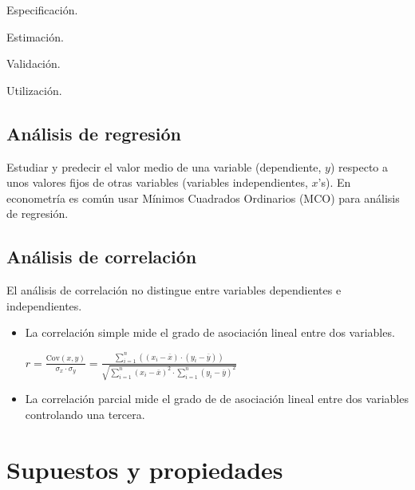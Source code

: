 \documentclass[10pt, a4paper, landscape]{article}
\newcommand{\Cov}{\mathrm{Cov}}
\begin{document}
\begin{multicols}{3}
		\begin{enumerate}[leftmargin=*]
			\setlength{\multicolsep}{0pt}
		\end{enumerate}
		
		\subsection*{Análisis de regresión}
		
		Estudiar y predecir el valor medio de una variable (dependiente, $y$) respecto a unos valores fijos de otras variables (variables independientes, $x$'s). En econometría es común usar Mínimos Cuadrados Ordinarios (MCO) para análisis de regresión.
		
		\subsection*{Análisis de correlación}
		
		El análisis de correlación no distingue entre variables dependientes e independientes.
		
		\begin{itemize}[leftmargin=*]
			\item La correlación simple mide el grado de asociación lineal entre dos variables.
			
			\begin{center}
				$r = \frac{\Cov(x, y)}{\sigma_{x} \cdot \sigma_{y}} = \frac{\sum_{i=1}^{n} ((x_{i} - \overline{x}) \cdot (y_{i} - \overline{y}))}{\sqrt{\sum_{i=1}^{n} (x_{i} - \overline{x})^{2} \cdot \sum_{i=1}^{n} (y_{i} - \overline{y})^{2}}}$
			\end{center}
			
			\item La correlación parcial mide el grado de de asociación lineal entre dos variables controlando una tercera.
		\end{itemize}
		
		\columnbreak
		
		\section*{Supuestos y propiedades}
		

\end{multicols}
\end{document}
